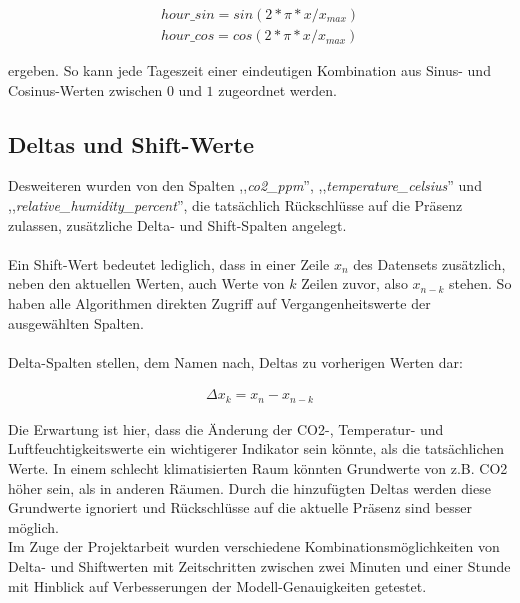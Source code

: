 \begin{align}
    hour\_sin = sin(2 * \pi * x / x_{max}) \\ 
    hour\_cos = cos(2 * \pi * x / x_{max})
\end{align} 

ergeben. So kann jede Tageszeit einer eindeutigen Kombination aus Sinus- und Cosinus-Werten zwischen 
$0$ und $1$ zugeordnet werden.

\subsection{Deltas und Shift-Werte}
Desweiteren wurden von den Spalten ,,\textit{co2\_ppm}'', ,,\textit{temperature\_celsius}'' und \break 
,,\textit{relative\_humidity\_percent}'', die tatsächlich Rückschlüsse auf die Präsenz zulassen, \break 
zusätzliche Delta- und Shift-Spalten angelegt.\\\\
Ein Shift-Wert bedeutet lediglich, dass  in einer Zeile $x_n$ des Datensets 
zusätzlich, neben den aktuellen Werten, auch Werte von $k$ Zeilen zuvor, also $x_{n-k}$ stehen. So haben 
alle Algorithmen direkten Zugriff auf Vergangenheitswerte der ausgewählten Spalten.\\\\
Delta-Spalten stellen, dem Namen nach, Deltas zu vorherigen Werten dar:

\begin{align}
    \Delta x_k = x_n - x_{n-k}    
\end{align}

Die Erwartung ist hier, dass die Änderung der CO2-, Temperatur- und 
Luftfeuchtigkeitswerte ein wichtigerer Indikator sein könnte, als die tatsächlichen Werte. In einem schlecht 
klimatisierten Raum könnten Grundwerte von z.B. CO2 höher sein, als in anderen Räumen. Durch die hinzufügten 
Deltas werden diese Grundwerte ignoriert und Rückschlüsse auf die aktuelle Präsenz sind besser möglich.\\
Im Zuge der Projektarbeit wurden verschiedene Kombinationsmöglichkeiten von Delta- und Shiftwerten mit 
Zeitschritten zwischen zwei Minuten und einer Stunde mit Hinblick auf Verbesserungen der Modell-Genauigkeiten 
getestet.

